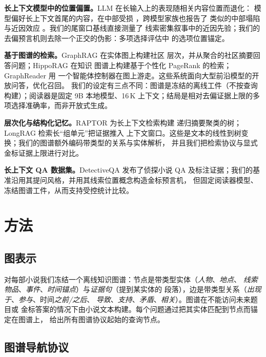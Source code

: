 \documentclass[UTF8,11pt]{ctexart}
\begin{document}
\textbf{长上下文模型中的位置偏置。}LLM 在长输入上的表现随相关内容位置而退化：
模型偏好长上下文首尾的内容，在中部受损 \citep{liu2024lost}，跨模型家族也报告了
类似的中部塌陷与近因效应 \citep{hsieh2024found}。我们的尾窗口基线直接测量了
线索密集叙事中的近因先验；我们的去偏预言机则去除一个正交的伪影：多项选择评估中
的选项位置锚定。

\textbf{基于图谱的检索。}GraphRAG \citep{edge2024graphrag} 在实体图上构建社区
层次，并从聚合的社区摘要回答问题；HippoRAG \citep{gutierrez2024hipporag} 在知识
图谱上构建基于个性化 PageRank 的检索；GraphReader \citep{li2024graphreader} 用
一个智能体控制器在图上游走。这些系统面向大型前沿模型的开放问答，优化召回。
我们的设定有三点不同：图谱是冻结的离线工件（不按查询构建）；阅读器是固定 9B
本地模型、16\,K 上下文；结局是相对去偏证据上限的多项选择准确率，而非开放式生成。

\textbf{层次化与结构化记忆。}RAPTOR \citep{sarthi2024raptor} 为长上下文检索构建
递归摘要聚类的树；LongRAG \citep{zhao2024longrag} 检索长``组单元''把证据推入
上下文窗口。这些是文本的线性到树变换；我们的图谱额外编码带类型的关系与实体解析，
并且我们把检索协议与显式金标证据上限进行对比。

\textbf{长上下文 QA 数据集。}DetectiveQA \citep{xu2024detectiveqa} 发布了侦探小说
QA 及标注证据；我们的基准沿用其提问风格，并用其线索位置概念构造金标预言机，
但固定阅读器模型、冻结图谱工件，从而支持受控统计比较。

\section{方法}
\label{sec:method}

\subsection{图表示}
\label{sec:graph}

对每部小说我们冻结一个离线知识图谱：节点是带类型实体（\emph{人物}、\emph{地点}、
\emph{线索物品}、\emph{事件}、\emph{时间锚点}）与\emph{证据句}（提到某实体的
段落），边是带类型关系（\emph{出现于}、\emph{参与}、时间\emph{之前/之后}、
\emph{导致}、\emph{支持}、\emph{矛盾}、\emph{相关}）。图谱在不能访问未来题目或
金标答案的情况下由小说文本构建。每个问题通过把其实体匹配到节点而锚定在图谱上，
给出所有图谱协议起始的查询节点。

\subsection{图谱导航协议}
\label{sec:protocols}
\end{document}
